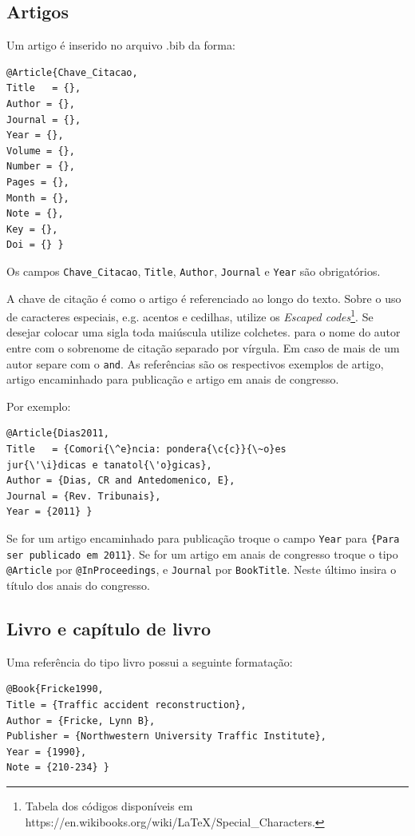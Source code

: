 \documentclass{RBClatex}
\begin{document}
\subsection{Artigos}

Um artigo é inserido no arquivo .bib da forma:
\begin{lstlisting}
@Article{Chave_Citacao,
Title	= {},
Author = {},
Journal = {},
Year = {},
Volume = {},
Number = {},
Pages = {},
Month = {}, 
Note = {},
Key = {},
Doi = {} }
\end{lstlisting}

Os campos \verb|Chave_Citacao|, \verb|Title|, \verb|Author|, \verb|Journal| e \verb|Year| são obrigatórios.

A chave de citação é como o artigo é referenciado ao longo do texto. Sobre o uso de caracteres especiais, e.g. acentos e cedilhas, utilize os \textit{Escaped codes}\footnote{Tabela dos códigos disponíveis em https://en.wikibooks.org/wiki/LaTeX/Special\_Characters.}. Se desejar colocar uma sigla toda maiúscula utilize colchetes. para o nome do autor entre com o sobrenome de citação separado por vírgula. Em caso de mais de um autor separe com o \verb|and|. As referências \cite{Gold2011,Dias2011,Silva2017,Pires2005} são os respectivos exemplos de artigo, artigo encaminhado para publicação e artigo em anais de congresso.

Por exemplo:
\begin{lstlisting}
@Article{Dias2011,
Title	= {Comori{\^e}ncia: pondera{\c{c}}{\~o}es 
jur{\'\i}dicas e tanatol{\'o}gicas},
Author = {Dias, CR and Antedomenico, E},
Journal = {Rev. Tribunais},
Year = {2011} }
\end{lstlisting}

Se for um artigo encaminhado para publicação troque o campo \verb|Year| para \verb|{Para ser publicado em 2011}|. Se for um artigo em anais de congresso troque o tipo \verb|@Article| por \verb|@InProceedings|, e \verb|Journal| por \verb|BookTitle|. Neste último insira o título dos anais do congresso.

\subsection{Livro e capítulo de livro}

Uma referência do tipo livro possui a seguinte formatação:
\begin{lstlisting}
@Book{Fricke1990,
Title = {Traffic accident reconstruction},
Author = {Fricke, Lynn B},
Publisher = {Northwestern University Traffic Institute},
Year = {1990},
Note = {210-234} }
\end{lstlisting}
\end{document}
